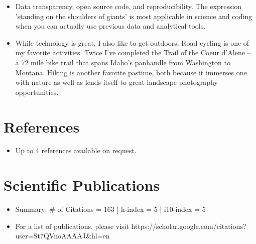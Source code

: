 \documentclass[11pt,a4paper,sans]{moderncv}        %
\begin{document}
\begin{itemize}

\item{Data transparency, open source code, and reproducibility. The expression 'standing on the shoulders of giants' is most applicable in science and coding when you can actually use previous data and analytical tools.}

\vspace{6pt}

\item{While technology is great, I also like to get outdoors. Road cycling is one of my favorite activities. Twice I've completed the Trail of the Coeur d'Alene -- a 72 mile bike trail that spans Idaho's panhandle from Washington to Montana. Hiking is another favorite pastime, both because it immerses one with nature as well as lends itself to great landscape photography opportunities.}



\end{itemize}

\section{References}

\vspace{6pt}
 
\begin{itemize}

\item{Up to 4 references available on request.}

\end{itemize}

\section{Scientific Publications}

\vspace{6pt}
 
\begin{itemize}

\item{Summary: \# of Citations = 163 |  h-index = 5 | i10-index = 5}
\vspace{6pt}
\item{For a list of publications, please visit https://scholar.google.com/citations?user=St7QVnoAAAAJ\&hl=en}


\end{itemize}
\end{document}
